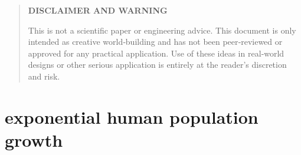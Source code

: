 \documentclass[a4paper]{article}
\begin{document}
	\sffamily
	\hyphenchar{}
	\sloppy
	
	\maketitle
	
	\textbf{
		\sloppy
		\hyphenchar{}
	}
	
	\vfill
	
	\begin{abstract}
		An exponential curve had been matched to the relevant data between the years 1900 and 2021/2023 in these areas: total population, life expectancy, GDP (global total \& per capita), energy consumption (global total \& per capita).
		
		\medskip
		
		Results are presented as plots showing the curve and the real data together, as well as plots \& tables showing resulting values for the future between years 2000 and 3000.
		
		\medskip
		
		This is in no way an argument for or against the idea that humanity in the real world will follow a general trend of exponential growth into the future, but rather merely a computation of the values that would result from applying that assumption for use in worldbuilding.
	\end{abstract}
	
	\vfill
	
	\begin{quote}
		\begin{center}
			\textbf{DISCLAIMER AND WARNING}
		\end{center}
		
		This is not a scientific paper or engineering advice.
		This document is only intended as creative world‑building and has not been peer‑reviewed or approved for any practical application.
		Use of these ideas in real‑world designs or other serious application is entirely at the reader’s discretion and risk.
	\end{quote}
	
	\vfill
	
	\tableofcontents
	
	\pagebreak

	
	\section{exponential human population growth}
	
\end{document}

